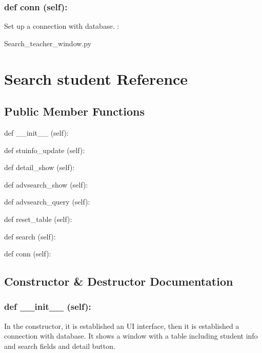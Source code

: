 \hypertarget{class_poly_a14a7ad77ce612b0c54f531d307ee4b39}{
\subsubsection[{def conn (self):}]{\setlength{\rightskip}{0pt plus 5cm}def {conn} (self):}}\label{class_poly_a14a7ad77ce612b0c54f531d307ee4b39}
Set up a connection with database.
:\begin{DoxyCompactItemize}
\item 
Search\_teacher\_window.\-py\end{DoxyCompactItemize}


\hypertarget{Search_student}{\section{Search student Reference}
\label{Search student}
}
\subsection*{Public Member Functions}
\begin{DoxyCompactItemize}
\item 
def {\_\_init\_\_} (self):
\item 
def {stuinfo\_update} (self):
\item 
def {detail\_show} (self):
\item 
def {advsearch\_show} (self):
\item 
def {advsearch\_query} (self):
\item 
def {reset\_table} (self):
\item 
def {search} (self):
\item 
def {conn} (self):
\end{DoxyCompactItemize}

\subsection{Constructor \& Destructor Documentation}
\hypertarget{class_poly_aa3def076b74bed67904976ad4f9fe9b1}{
\subsubsection[{def __init__ (self):}]{\setlength{\rightskip}{0pt plus 5cm}def {\_\_init\_\_} (self): 
}}
In the constructor, it is established an UI interface, then it is  established a connection with database. It shows a window with a table including student info and search fields and detail button. 
 

